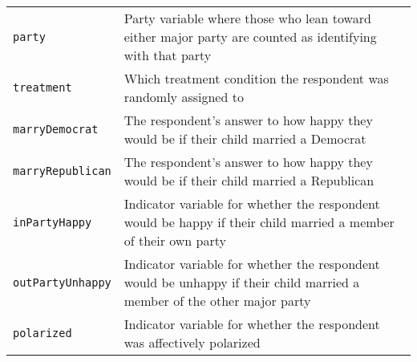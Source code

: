 \documentclass[
]{article}
\begin{document}
\begin{longtable}[]{@{}ll@{}}
\begin{minipage}[t]{0.33\columnwidth}
\texttt{party}\strut
\end{minipage} & \begin{minipage}[t]{0.61\columnwidth}\raggedright
Party variable where those who lean toward either major party are
counted as identifying with that party\strut
\end{minipage}\tabularnewline
\begin{minipage}[t]{0.33\columnwidth}\raggedright
\texttt{treatment}\strut
\end{minipage} & \begin{minipage}[t]{0.61\columnwidth}\raggedright
Which treatment condition the respondent was randomly assigned to\strut
\end{minipage}\tabularnewline
\begin{minipage}[t]{0.33\columnwidth}\raggedright
\texttt{marryDemocrat}\strut
\end{minipage} & \begin{minipage}[t]{0.61\columnwidth}\raggedright
The respondent's answer to how happy they would be if their child
married a Democrat\strut
\end{minipage}\tabularnewline
\begin{minipage}[t]{0.33\columnwidth}\raggedright
\texttt{marryRepublican}\strut
\end{minipage} & \begin{minipage}[t]{0.61\columnwidth}\raggedright
The respondent's answer to how happy they would be if their child
married a Republican\strut
\end{minipage}\tabularnewline
\begin{minipage}[t]{0.33\columnwidth}\raggedright
\texttt{inPartyHappy}\strut
\end{minipage} & \begin{minipage}[t]{0.61\columnwidth}\raggedright
Indicator variable for whether the respondent would be happy if their
child married a member of their own party\strut
\end{minipage}\tabularnewline
\begin{minipage}[t]{0.33\columnwidth}\raggedright
\texttt{outPartyUnhappy}\strut
\end{minipage} & \begin{minipage}[t]{0.61\columnwidth}\raggedright
Indicator variable for whether the respondent would be unhappy if their
child married a member of the other major party\strut
\end{minipage}\tabularnewline
\begin{minipage}[t]{0.33\columnwidth}\raggedright
\texttt{polarized}\strut
\end{minipage} & \begin{minipage}[t]{0.61\columnwidth}\raggedright
Indicator variable for whether the respondent was affectively
polarized\strut
\end{minipage}\tabularnewline
\bottomrule
\end{longtable}
\end{document}
